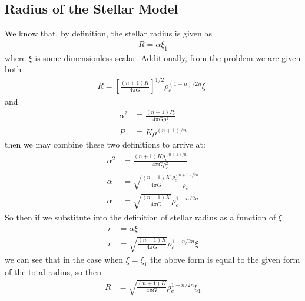 \subsection{Radius of the Stellar Model}
We know that, by definition, the stellar radius is given as
\begin{align*}
    R = \alpha \xi_{1}
\end{align*}
where $\xi$ is some dimensionless scalar. Additionally, from the problem we are given both
\begin{align*}
    R = \left[\frac{(n+1)K}{4\pi G}\right]^{1/2}\rho_{c}^{(1-n)/2n}\xi_{1}
\end{align*}
and
\begin{align*}
    \alpha^{2} &\equiv \frac{(n+1)P_{c}}{4\pi G\rho_{c}^{2}} \\
    P &\equiv K\rho^{(n+1)/n} 
\end{align*}
then we may combine these two definitions to arrive at:
\begin{align*}
    \alpha^{2} &= \frac{(n+1)K\rho_{c}^{(n+1)/n} }{4\pi G\rho_{c}^{2}} \\
    \alpha &= \sqrt{\frac{(n+1)K}{4\pi G}}\frac{\rho^{(n+1)/2n}_{c}}{\rho_{c}} \\
    \alpha &= \sqrt{\frac{(n+1)K}{4\pi G}}\rho_{c}^{1-n/2n}
\end{align*}
So then if we substitute into the definition of stellar radius as a function of $\xi$
\begin{align*}
    r &= \alpha \xi \\
    r &=  \sqrt{\frac{(n+1)K}{4\pi G}}\rho_{c}^{1-n/2n}\xi
\end{align*}
we can see that in the case when $\xi = \xi_{1}$ the above form is equal to the given form of the total radius, so then
\begin{align*}
    R &=  \sqrt{\frac{(n+1)K}{4\pi G}}\rho_{c}^{1-n/2n}\xi_{1}
\end{align*}

